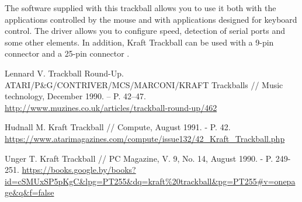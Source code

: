 \documentclass[11pt, a4paper]{article}
\begin{document}
The software supplied with this trackball allows you to use it both with the applications controlled by the mouse and with applications designed for keyboard control. The driver allows you to configure speed, detection of serial ports and some other elements. In addition, Kraft Trackball can be used with a 9-pin connector and a 25-pin connector \cite{Hudnall}.

\begin{thebibliography}{9}
 Lennard V. Trackball Round-Up. ATARI/P\&G/CONTRIVER/MCS/MARCONI/KRAFT Trackballs // Music technology, December 1990. -- P. 42--47. \url{http://www.muzines.co.uk/articles/trackball-round-up/462}

 Hudnall M. Kraft Trackball // Compute, August 1991. - P. 42. \url{https://www.atarimagazines.com/compute/issue132/42_Kraft_Trackball.php}

 Unger T. Kraft Trackball // PC Magazine, V. 9, No. 14, August 1990. - P. 249-251. \url{https://books.google.by/books?id=cSMUxSP5pKgC&lpg=PT255&dq=kraft%20trackball&pg=PT255#v=onepage&q&f=false}
\end{thebibliography}
\end{document}
